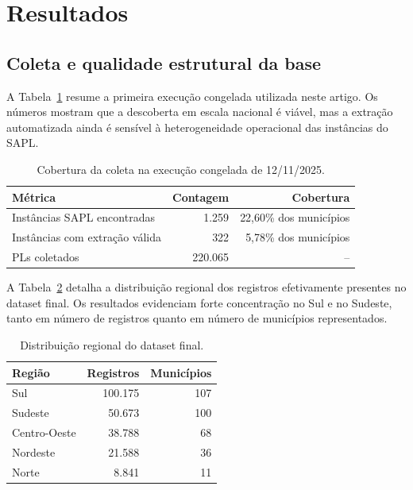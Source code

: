 \section{Resultados}

\subsection{Coleta e qualidade estrutural da base}

A Tabela~\ref{tab:coleta-v2} resume a primeira execução congelada utilizada neste artigo. Os números mostram que a descoberta em escala nacional é viável, mas a extração automatizada ainda é sensível à heterogeneidade operacional das instâncias do SAPL.

\begin{table}[H]
\centering
\caption{Cobertura da coleta na execução congelada de 12/11/2025.}
\label{tab:coleta-v2}
\small
\begin{tabular}{l r r}
\toprule
Métrica & Contagem & Cobertura \\
\midrule
Instâncias SAPL encontradas & 1.259 & 22,60\% dos municípios \\
Instâncias com extração válida & 322 & 5,78\% dos municípios \\
PLs coletados & 220.065 & -- \\
\bottomrule
\end{tabular}
\end{table}

A Tabela~\ref{tab:regioes-v2} detalha a distribuição regional dos registros efetivamente presentes no dataset final. Os resultados evidenciam forte concentração no Sul e no Sudeste, tanto em número de registros quanto em número de municípios representados.

\begin{table}[H]
\centering
\caption{Distribuição regional do dataset final.}
\label{tab:regioes-v2}
\small
\begin{tabular}{l r r}
\toprule
Região & Registros & Municípios \\
\midrule
Sul & 100.175 & 107 \\
Sudeste & 50.673 & 100 \\
Centro-Oeste & 38.788 & 68 \\
Nordeste & 21.588 & 36 \\
Norte & 8.841 & 11 \\
\bottomrule
\end{tabular}
\end{table}

